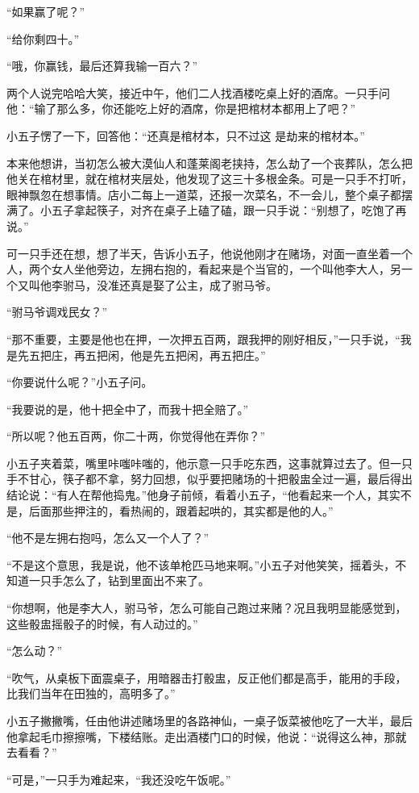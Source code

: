 “如果赢了呢？”

“给你剩四十。”

“哦，你赢钱，最后还算我输一百六？”

两个人说完哈哈大笑，接近中午，他们二人找酒楼吃桌上好的酒席。一只手问他：“输了那么多，你还能吃上好的酒席，你是把棺材本都用上了吧？”

小五子愣了一下，回答他：“还真是棺材本，只不过这
是劫来的棺材本。”

本来他想讲，当初怎么被大漠仙人和蓬莱阁老挟持，怎么劫了一个丧葬队，怎么把他关在棺材里，就在棺材夹层处，他发现了这三十多根金条。可是一只手不打听，眼神飘忽在想事情。店小二每上一道菜，还报一次菜名，不一会儿，整个桌子都摆满了。小五子拿起筷子，对齐在桌子上磕了磕，跟一只手说：“别想了，吃饱了再说。”

可一只手还在想，想了半天，告诉小五子，他说他刚才在赌场，对面一直坐着一个人，两个女人坐他旁边，左拥右抱的，看起来是个当官的，一个叫他李大人，另一个又叫他李驸马，没准还真是娶了公主，成了驸马爷。

“驸马爷调戏民女？”

“那不重要，主要是他也在押，一次押五百两，跟我押的刚好相反，”一只手说，“我是先五把庄，再五把闲，他是先五把闲，再五把庄。”

“你要说什么呢？”小五子问。

“我要说的是，他十把全中了，而我十把全赔了。”

“所以呢？他五百两，你二十两，你觉得他在弄你？”

小五子夹着菜，嘴里咔嗤咔嗤的，他示意一只手吃东西，这事就算过去了。但一只手不甘心，筷子都不拿，努力回想，似乎要把赌场的十把骰盅全过一遍，最后得出结论说：“有人在帮他捣鬼。”他身子前倾，看着小五子，“他看起来一个人，其实不是，后面那些押注的，看热闹的，跟着起哄的，其实都是他的人。”

“他不是左拥右抱吗，怎么又一个人了？”

“不是这个意思，我是说，他不该单枪匹马地来啊。”小五子对他笑笑，摇着头，不知道一只手怎么了，钻到里面出不来了。

“你想啊，他是李大人，驸马爷，怎么可能自己跑过来赌？况且我明显能感觉到，这些骰盅摇骰子的时候，有人动过的。”

“怎么动？”

“吹气，从桌板下面震桌子，用暗器击打骰盅，反正他们都是高手，能用的手段，比我们当年在田独的，高明多了。”

小五子撇撇嘴，任由他讲述赌场里的各路神仙，一桌子饭菜被他吃了一大半，最后他拿起毛巾擦擦嘴，下楼结账。走出酒楼门口的时候，他说：“说得这么神，那就去看看？”

“可是，”一只手为难起来，“我还没吃午饭呢。”
\newline

